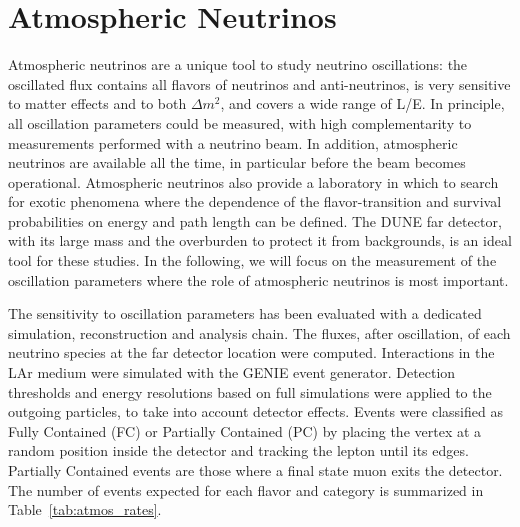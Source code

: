 \section{Atmospheric Neutrinos}
\label{sec:physics-atmpdk-atmnu}

Atmospheric neutrinos are a unique tool to study neutrino oscillations: the 
oscillated flux contains all flavors of neutrinos and anti-neutrinos, is very sensitive to 
matter effects and to both $\Delta m^2$, and covers a wide range of L/E. In principle, 
all oscillation parameters could be measured, with high complementarity to 
measurements performed with a neutrino beam. In addition, atmospheric 
neutrinos are available all the time, in particular before the beam becomes 
operational. Atmospheric neutrinos also provide a laboratory in which to search 
for exotic phenomena where the dependence of the flavor-transition and survival 
probabilities on energy and path length can be defined. The DUNE far detector, 
with its large mass and the overburden to protect it from backgrounds, is an 
ideal tool for these studies. In the following, we will focus on the 
measurement of the oscillation parameters where the role of atmospheric neutrinos is 
most important. 

The sensitivity to oscillation parameters has been evaluated with a 
dedicated simulation, reconstruction and analysis chain. 
The fluxes, after 
oscillation, of each neutrino species at the far detector location were 
computed. Interactions in the LAr medium were simulated with the GENIE event 
generator. Detection thresholds and energy resolutions based on full 
simulations were applied to the outgoing particles, to take into account 
detector effects. Events were classified as Fully Contained (FC) or 
Partially Contained (PC) by placing the vertex at a random position inside the 
detector and tracking the lepton until its edges.  Partially Contained events 
are those where a final state muon exits the detector.  The number of events expected 
for each flavor and category is summarized in Table~\ref{tab:atmos_rates}.

%
\begin{table}[!htbp]
\caption[Atmospheric-neutrino event rates]
        {
         Atmospheric-neutrino event rates including oscillations in \SI{350}{\ktyr} 
         with a LArTPC, fully or partially contained in the detector fiducial volume. 
        }
\begin{center}
\end{center}
\label{tab:atmos_rates}
\end{table}
%

